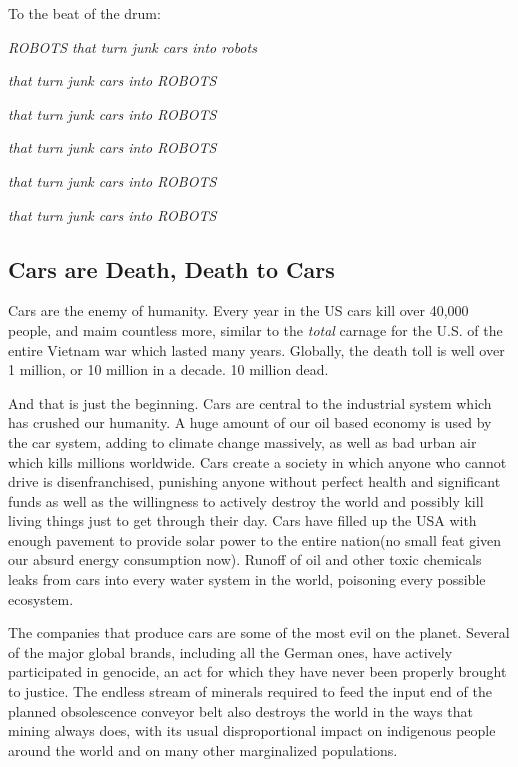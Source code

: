 To the beat of the drum:

\emph{ROBOTS that turn junk cars into robots}

\emph{that turn junk cars into ROBOTS}

\emph{that turn junk cars into ROBOTS}

\emph{that turn junk cars into ROBOTS}

\emph{that turn junk cars into ROBOTS}

\emph{that turn junk cars into ROBOTS}

\subsection{Cars are Death, Death to
Cars}\label{cars-are-death-death-to-cars}

Cars are the enemy of humanity. Every year in the US cars kill over
40,000 people, and maim countless more, similar to the \emph{total}
carnage for the U.S. of the entire Vietnam war which lasted many years.
Globally, the death toll is well over 1 million, or 10 million in a
decade. 10 million dead.

And that is just the beginning. Cars are central to the industrial
system which has crushed our humanity. A huge amount of our oil based
economy is used by the car system, adding to climate change massively,
as well as bad urban air which kills millions worldwide. Cars create a
society in which anyone who cannot drive is disenfranchised, punishing
anyone without perfect health and significant funds as well as the
willingness to actively destroy the world and possibly kill living
things just to get through their day. Cars have filled up the USA with
enough pavement to provide solar power to the entire nation(no small
feat given our absurd energy consumption now). Runoff of oil and other
toxic chemicals leaks from cars into every water system in the world,
poisoning every possible ecosystem.

The companies that produce cars are some of the most evil on the planet.
Several of the major global brands, including all the German ones, have
actively participated in genocide, an act for which they have never been
properly brought to justice. The endless stream of minerals required to
feed the input end of the planned obsolescence conveyor belt also
destroys the world in the ways that mining always does, with its usual
disproportional impact on indigenous people around the world and on many
other marginalized populations.

